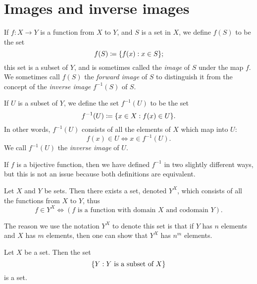 \section{Images and inverse images}\label{sec:3.4}

\begin{defn}\label{3.4.1}
  If \(f : X \to Y\) is a function from \(X\) to \(Y\), and \(S\) is a set in \(X\), we define \(f(S)\) to be the set
  \[
    f(S) \coloneqq \set{f(x) : x \in S};
  \]
  this set is a subset of \(Y\), and is sometimes called the \emph{image} of \(S\) under the map \(f\).
  We sometimes call \(f(S)\) the \emph{forward image} of \(S\) to distinguish it from the concept of the \emph{inverse image} \(f^{-1}(S)\) of \(S\).
\end{defn}

\setcounter{thm}{3}
\begin{defn}\label{3.4.4}
  If \(U\) is a subset of \(Y\), we define the set \(f^{-1}(U)\) to be the set
  \[
    f^{-1}(U) \coloneqq \set{x \in X : f(x) \in U}.
  \]
  In other words, \(f^{-1}(U)\) consists of all the elements of \(X\) which map into \(U\):
  \[
    f(x) \in U \iff x \in f^{-1}(U).
  \]
  We call \(f^{-1}(U)\) the \emph{inverse image} of \(U\).
\end{defn}

\setcounter{thm}{6}
\begin{rmk}\label{3.4.6}
  If \(f\) is a bijective function, then we have defined \(f^{-1}\) in two slightly different ways, but this is not an issue because both definitions are equivalent.
\end{rmk}

\begin{ax}\label{3.10}
  Let \(X\) and \(Y\) be sets.
  Then there exists a set, denoted \(Y^X\), which consists of all the functions from \(X\) to \(Y\), thus
  \[
    f \in Y^X \iff (f \text{ is a function with domain } X \text{ and codomain } Y).
  \]
\end{ax}

\begin{note}
  The reason we use the notation \(Y^X\) to denote this set is that if \(Y\) has \(n\) elements and \(X\) has \(m\) elements, then one can show that \(Y^X\) has \(n^m\) elements.
\end{note}

\setcounter{thm}{8}
\begin{lem}\label{3.4.9}
  Let \(X\) be a set.
  Then the set
  \[
    \left\lbrace Y : Y \text{ is a subset of } X\right\rbrace
  \]
  is a set.
\end{lem}

